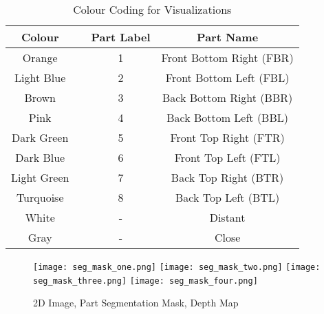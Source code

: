 \documentclass[main.tex]{subfiles}
\begin{document}
\begin{table}[h]
\centering
	\begin{tabular}{| c | c | c | c |}
		\hline
		\textbf{Colour} &  & \textbf{Part Label} & \textbf{Part Name} \\
		\hline
		\hline
		Orange & \cellcolor{Orange} & 1 & Front Bottom Right (FBR) \\
		\hline
		Light Blue & \cellcolor{LightBlue} & 2 & Front Bottom Left (FBL) \\
		\hline
		Brown & \cellcolor{Brown} & 3 & Back Bottom Right (BBR) \\
		\hline
		Pink & \cellcolor{Pink} & 4 & Back Bottom Left (BBL) \\
		\hline
		Dark Green & \cellcolor{DarkGreen} & 5 & Front Top Right (FTR) \\
		\hline
		Dark Blue & \cellcolor{DarkBlue} & 6 & Front Top Left (FTL) \\
		\hline
		Light Green & \cellcolor{LightGreen} & 7 & Back Top Right (BTR) \\
		\hline
		Turquoise & \cellcolor{Turquoise} & 8 & Back Top Left (BTL) \\
		\hline
		White & \cellcolor{white} & - & Distant \\
		\hline
		Gray & \cellcolor{gray} & - & Close \\
		\hline
	\end{tabular}	
\caption{Colour Coding for Visualizations}
\label{tab:colours}
\end{table}
\begin{figure}[h]
\centering
\texttt{[image: seg\_mask\_one.png]}\vfill
\texttt{[image: seg\_mask\_two.png]} \vfill
\texttt{[image: seg\_mask\_three.png]} \vfill
\texttt{[image: seg\_mask\_four.png]}
\caption{2D Image, Part Segmentation Mask, Depth Map}
\label{fig:partseg}
\end{figure}
\end{document}
